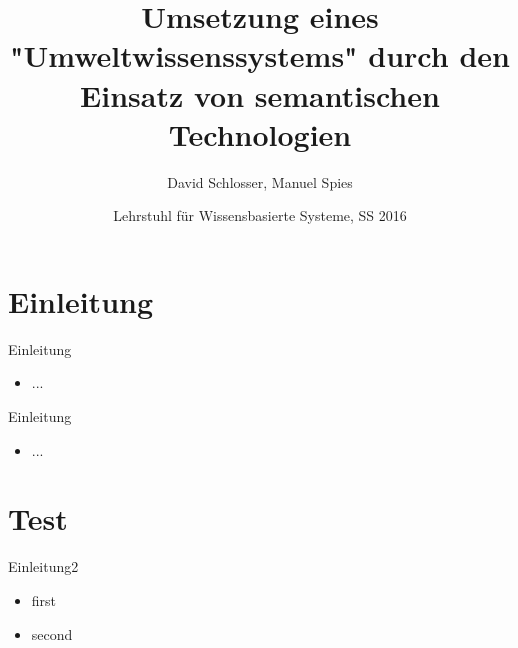 \documentclass[aspectratio=169]{beamer}
\title[Umwelt PG]{%
  Umsetzung eines "Umweltwissenssystems" durch den Einsatz von semantischen Technologien}
\subtitle{}
\author[David Schlosser, Manuel Spies]{%
  David Schlosser, Manuel Spies}
\date[Lehrstuhl für Wissensbasierte Systeme, SS 2016]{Lehrstuhl für Wissensbasierte Systeme, SS 2016}
\begin{document}
\begin{frame}
  \maketitle
\end{frame}

\section{Einleitung}

\begin{frame}{Einleitung}
  \begin{itemize}
    \item ...
  \end{itemize}
\end{frame}

\begin{frame}{Einleitung}
  \begin{itemize}
    \item ...
  \end{itemize}
\end{frame}

\section{Test}

\begin{frame}{Einleitung2}
  \begin{itemize}
  	\item first
  	\item second
  \end{itemize}
\end{frame}
\end{document}
